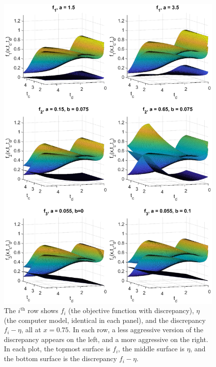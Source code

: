 \documentclass[10pt]{asme2ej}
\begin{document}
\begin{figure}
	\centering
	\includegraphics[scale=0.85]{figures/figure_4.eps}
	\captionsetup{width=.85\linewidth}
	\caption{The $i^{\text{th}}$ row shows $f_i$ (the objective function with discrepancy), $\eta$ (the computer model, identical in each panel), and the discrepancy $f_i-\eta$, all at $x=0.75$. In each row, a less aggressive version of the discrepancy appears on the left, and a more aggressive on the right. In each plot, the topmost surface is $f_i$, the middle surface is $\eta$, and the bottom surface is the discrepancy $f_i-\eta$.}
	\label{fig:discrepancies}
\end{figure}
%
\end{document}
